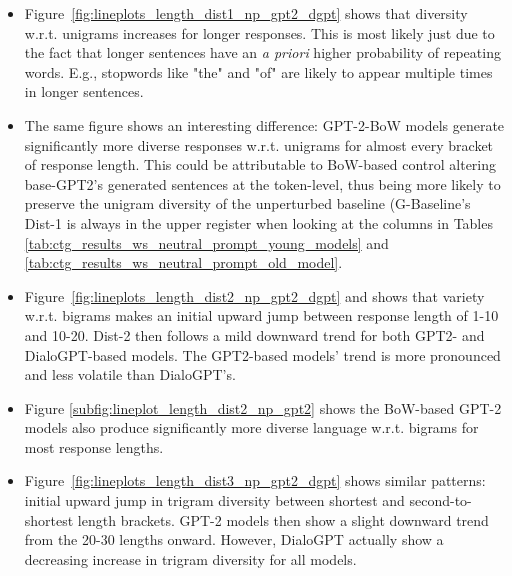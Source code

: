 \begin{itemize}
    \item Figure~\ref{fig:lineplots_length_dist1_np_gpt2_dgpt} shows that diversity w.r.t. unigrams increases for longer responses. This is most likely just due to the fact that longer sentences have an \textit{a priori} higher probability of repeating words. E.g., stopwords like "the" and "of" are likely to appear multiple times in longer sentences. 
    \item The same figure shows an interesting difference: GPT-2-BoW models generate significantly more diverse responses w.r.t. unigrams for almost every bracket of response length. This could be attributable to BoW-based control altering base-GPT2's generated sentences at the token-level, thus being more likely to preserve the unigram diversity of the unperturbed baseline (G-Baseline's Dist-1 is always in the upper register when looking at the columns in Tables \ref{tab:ctg_results_ws_neutral_prompt_young_models} and \ref{tab:ctg_results_ws_neutral_prompt_old_model}.
    \item Figure~\ref{fig:lineplots_length_dist2_np_gpt2_dgpt} and shows that variety w.r.t. bigrams makes an initial upward jump between response length of 1-10 and 10-20. Dist-2 then follows a mild downward trend for both GPT2- and DialoGPT-based models. The GPT2-based models' trend is more pronounced and less volatile than DialoGPT's.
    \item Figure \ref{subfig:lineplot_length_dist2_np_gpt2} shows the BoW-based GPT-2 models also produce significantly more diverse language w.r.t. bigrams for most response lengths.
    \item Figure~\ref{fig:lineplots_length_dist3_np_gpt2_dgpt} shows similar patterns: initial upward jump in trigram diversity between shortest and second-to-shortest length brackets. GPT-2 models then show a slight downward trend from the 20-30 lengths onward. However, DialoGPT actually show a decreasing increase in trigram diversity for all models.
\end{itemize}

